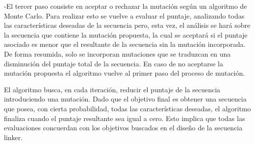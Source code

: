     -El tercer paso consiste en aceptar o rechazar la mutación según un algoritmo de Monte Carlo. Para realizar esto se vuelve a evaluar el puntaje, analizando todas las características deseadas de la secuencia pero, esta vez, el análisis se hará sobre la secuencia que contiene la mutación propuesta, la cual se aceptará si el puntaje asociado es menor que el  resultante de la secuencia sin la mutación incorporada. De forma resumida, solo se incorporan mutaciones que se traduzcan en una disminución del puntaje total de la secuencia.
En caso de no aceptarse la mutación propuesta el algoritmo vuelve al primer paso del proceso de mutación.

El algoritmo busca, en cada iteración, reducir el puntaje de la secuencia introduciendo una mutación. Dado que el objetivo final es obtener una secuencia que posea, con cierta probabilidad, todas las características deseadas, el algoritmo finaliza cuando el puntaje resultante sea igual a cero. Esto implica que todas las evaluaciones concuerdan con los objetivos buscados en el diseño de la secuencia linker.

